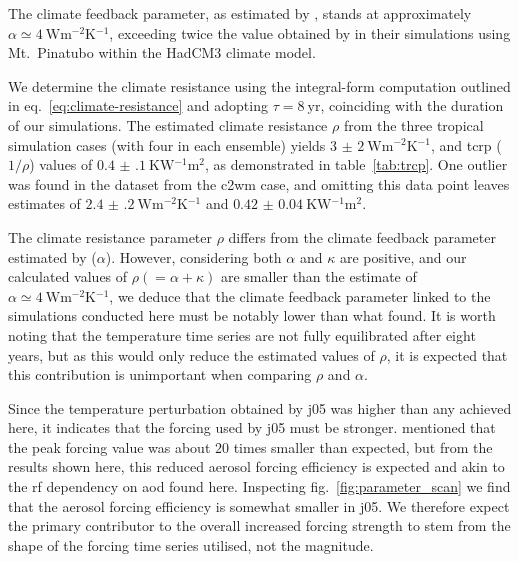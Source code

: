\documentclass{ametsocV6.1}
\begin{document}
The climate feedback parameter, as estimated by \citet{jones2005}, stands at
approximately \(\alpha \simeq \SI{4}{\watt\metre^{-2}\kelvin^{-1}}\), exceeding twice
the value obtained by \citet{gregory2016} in their simulations using Mt.\ Pinatubo
within the HadCM3 climate model.

We determine the climate resistance using the integral-form computation outlined in
eq.~\ref{eq:climate-resistance} and adopting \(\tau =\SI{8}{\mathrm{yr}}\), coinciding
with the duration of our simulations. The estimated climate resistance \(\rho \) from
the three tropical simulation cases (with four in each ensemble) yields
\(\SI{3(2)}{\watt\metre^{-2}\kelvin^{-1}}\), and \gls{tcrp} (\(1/\rho\)) values of
\(\SI{0.4(1)}{\kelvin\watt^{-1}\metre^{2}}\), as demonstrated in table~\ref{tab:trcp}.
One outlier was found in the dataset from the \gls{c2wm} case, and omitting this data
point leaves estimates of \(\SI{2.4(2)}{\watt\metre^{-2}\kelvin^{-1}}\) and
\(\SI{0.42(4)}{\kelvin\watt^{-1}\metre^{2}}\).

The climate resistance parameter \(\rho\) differs from the climate feedback parameter
estimated by \citet{jones2005} (\(\alpha\)). However, considering both \(\alpha\) and
\(\kappa\) are positive, and our calculated values of \(\rho(=\alpha+\kappa)\) are
smaller than the \citet{jones2005} estimate of \(\alpha \simeq
\SI{4}{\watt\metre^{-2}\kelvin^{-1}}\), we deduce that the climate feedback parameter
linked to the simulations conducted here must be notably lower than what
\citet{jones2005} found. It is worth noting that the temperature time series are not
fully equilibrated after eight years, but as this would only reduce the estimated values
of \(\rho\), it is expected that this contribution is unimportant when comparing
\(\rho\) and \(\alpha\).

Since the temperature perturbation obtained by \gls{j05} was higher than any achieved
here, it indicates that the forcing used by \gls{j05} must be stronger.
\citet{gregory2016} mentioned that the peak forcing value was about \(20\) times smaller
than expected, but from the results shown here, this reduced aerosol forcing efficiency
is expected and akin to the \gls{rf} dependency on \gls{aod} found here. Inspecting
fig.~\ref{fig:parameter_scan} we find that the aerosol forcing efficiency is somewhat
smaller in \gls{j05}. We therefore expect the primary contributor to the overall
increased forcing strength to stem from the shape of the forcing time series utilised,
not the magnitude.
\end{document}
